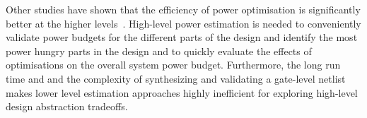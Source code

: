 
Other studies have shown that the efficiency of power optimisation is significantly better at the higher levels~\cite{Landman1996,Gupta2000,Raghunathan2003,Reimer2006}.
High-level power estimation is needed to conveniently validate power budgets for the different parts of the design and identify the most power hungry parts in the design and to quickly evaluate the effects of optimisations on the overall system power budget.
Furthermore, the long run time and and the complexity of synthesizing and validating a gate-level netlist makes lower level estimation approaches highly inefficient for exploring high-level design abstraction tradeoffs.

